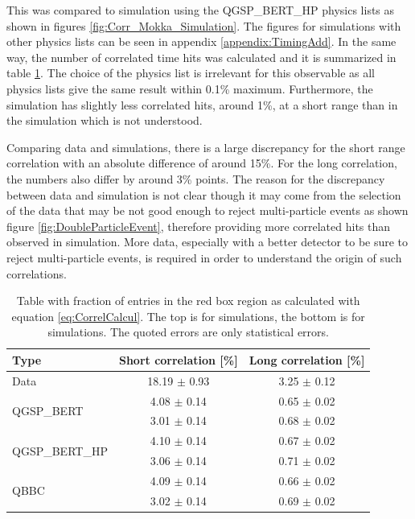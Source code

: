 This was compared to simulation using the QGSP\_BERT\_HP physics lists as shown in figures \ref{fig:Corr_Mokka_Simulation}. The figures for simulations with other physics lists can be seen in appendix \ref{appendix:TimingAdd}. In the same way, the number of correlated time hits was calculated and it is summarized in table \ref{table:Correlation_DataSim}. The choice of the physics list is irrelevant for this observable as all physics lists give the same result within 0.1\% maximum. Furthermore, the \ddhep simulation has slightly less correlated hits, around 1\%, at a short range than in the \mokka simulation which is not understood.

Comparing data and simulations, there is a large discrepancy for the short range correlation with an absolute difference of around 15\%. For the long correlation, the numbers also differ by around 3\% points. The reason for the discrepancy between data and simulation is not clear though it may come from the selection of the data that may be not good enough to reject multi-particle events as shown figure \ref{fig:DoubleParticleEvent}, therefore providing more correlated hits than observed in simulation. More data, especially with a better detector to be sure to reject multi-particle events, is required in order to understand the origin of such correlations.

\begin{table}[htb!]
	\centering
	\caption{Table with fraction of entries in the red box region as calculated with equation \ref{eq:CorrelCalcul}. The top is for \mokka simulations, the bottom is for \ddhep simulations. The quoted errors are only statistical errors.}
	\label{table:Correlation_DataSim}
	\begin{tabular}{@{} lcc @{}}
		\toprule
		Type & Short correlation [\%] & Long correlation [\%]\\
		\midrule
		\multirow{2}{*}{Data} & \multirow{2}{*}{18.19 $\pm$ 0.93} & \multirow{2}{*}{3.25 $\pm$ 0.12}\\ & &\\
		\midrule
		\multirow{2}{*}{QGSP\_BERT} & 4.08 $\pm$ 0.14 & 0.65 $\pm$ 0.02\\ & 3.01 $\pm$ 0.14 & 0.68 $\pm$ 0.02\\
		\multirow{2}{*}{QGSP\_BERT\_HP} & 4.10 $\pm$ 0.14 & 0.67 $\pm$ 0.02\\ & 3.06 $\pm$ 0.14 & 0.71 $\pm$ 0.02\\
		\multirow{2}{*}{QBBC} & 4.09 $\pm$ 0.14 & 0.66 $\pm$ 0.02\\ & 3.02 $\pm$ 0.14 & 0.69 $\pm$ 0.02\\
		\bottomrule
	\end{tabular}
\end{table}

